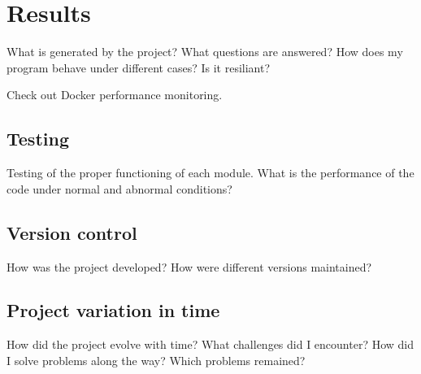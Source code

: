\chapter{Results}
\label{ch:results}
What is generated by the project?
What questions are answered?
How does my program behave under different cases?
Is it resiliant?

Check out Docker performance monitoring.

\section{Testing}
\label{s:testing}
Testing of the proper functioning of each module.
What is the performance of the code under normal and abnormal conditions?


\section{Version control}
How was the project developed?
How were different versions maintained?


\section{Project variation in time}
How did the project evolve with time?
What challenges did I encounter?
How did I solve problems along the way?
Which problems remained?
